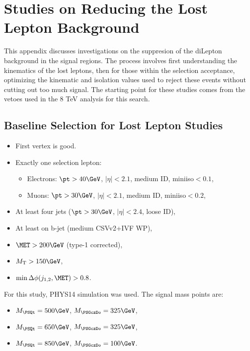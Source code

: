 \section{Studies on Reducing the Lost Lepton Background}
\label{sec:lost_lepton_studies}

This appendix discusses investigations on the suppresion of the diLepton background in the signal regions.  The process involves first understanding the kinematics of the lost leptons, then for those within the selection acceptance, optimizing the kinematic and isolation values used to reject these events without cutting out too much signal.  The starting point for these studies comes from the vetoes used in the 8 TeV analysis for this search.  


\subsection{Baseline Selection for Lost Lepton Studies}
\label{sec:lost_lepton_studies:baseline_selection}

\begin{itemize}
\item First vertex is good.
\item Exactly one selection lepton:
	\begin{itemize}
	\item Electrons: $\pt>40\GeV$, $|\eta|<2.1$, medium ID, miniiso$ < 0.1$,
	\item Muons: $\pt>30\GeV$, $|\eta|<2.1$, medium ID, miniiso$ < 0.2$,
	\end{itemize}
\item  At least four jets ($\pt>30\GeV$, $|\eta|<2.4$, loose ID),
\item  At least on b-jet (medium CSVv2+IVF WP),
\item  $\MET>200\GeV$ (type-1 corrected),
\item  $\MT>150\GeV$,
\item  $\minDPhiMETjet>0.8$.
\end{itemize}

For this study, PHYS14 simulation was used. The signal mass points are:
\begin{itemize}
\item $M_{\PSQt} = 500\GeV$, $M_{\PSGczDo} = 325\GeV$,
\item $M_{\PSQt} = 650\GeV$, $M_{\PSGczDo} = 325\GeV$,
\item $M_{\PSQt} = 850\GeV$, $M_{\PSGczDo} = 100\GeV$.
\end{itemize}

